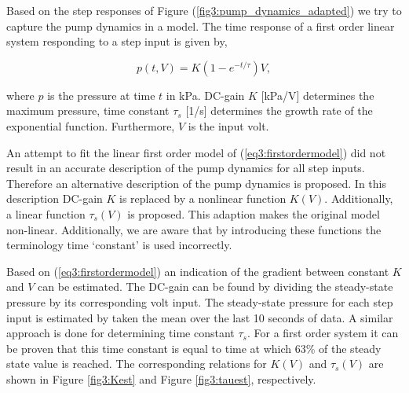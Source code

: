 Based on the step responses of Figure (\ref{fig3:pump_dynamics_adapted}) we try to capture the pump dynamics in a model. The time response of a first order linear system responding to a step input is given by, 

\begin{equation}
    p(t,V) = K(1-e^{-t/\tau})V,
    \label{eq3:firstordermodel}
\end{equation}

where $p$ is the pressure at time $t$ in kPa. DC-gain $K$ [kPa/V] determines the maximum pressure, time constant $\tau_s$ [1/s] determines the growth rate of the exponential function. Furthermore, $V$ is the input volt. 

An attempt to fit the linear first order model of (\ref{eq3:firstordermodel}) did not result in an accurate description of the pump dynamics for all step inputs. Therefore an alternative description of the pump dynamics is proposed. In this description DC-gain $K$ is replaced by a nonlinear function $K(V)$. Additionally, a linear function $\tau_s(V)$ is proposed. This adaption makes the original model non-linear. Additionally, we are aware that by introducing these functions the terminology time `constant' is used incorrectly.


Based on (\ref{eq3:firstordermodel}) an indication of the gradient between constant $K$ and $V$ can be estimated. The DC-gain can be found by dividing the steady-state pressure by its corresponding volt input. The steady-state pressure for each step input is estimated by taken the mean over the last 10 seconds of data. A similar approach is done for determining time constant $\tau_s$. For a first order system it can be proven that this time constant is equal to time at which 63\% of the steady state value is reached. The corresponding relations for $K(V)$ and $\tau_s(V)$ are shown in Figure \ref{fig3:Kest} and Figure \ref{fig3:tauest}, respectively.
\newpage

